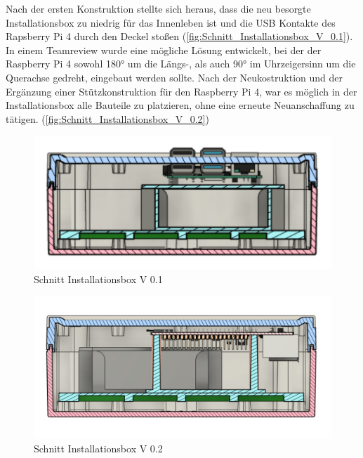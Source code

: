 Nach der ersten Konstruktion stellte sich heraus, dass die neu besorgte Installationsbox zu niedrig für das Innenleben ist und die USB Kontakte des Rapsberry Pi 4 durch den Deckel stoßen (\autoref{fig:Schnitt_Installationsbox_V_0.1}). In einem Teamreview wurde eine mögliche Lösung entwickelt, bei der der Raspberry Pi 4 sowohl \ang{180} um die Längs-, als auch \ang{90} im Uhrzeigersinn um die Querachse gedreht, eingebaut werden sollte. Nach der Neukostruktion und der Ergänzung einer Stützkonstruktion für den Raspberry Pi 4, war es möglich in der Installationsbox alle Bauteile zu platzieren, ohne eine erneute Neuanschaffung zu tätigen. (\autoref{fig:Schnitt_Installationsbox_V_0.2})

\begin{figure}[h]
	\begin{center}
		\includegraphics[scale=0.25]{Sections/Konstruktion_des_Aufbaus/Schnitt_Installationsbox_V_0.1}
	\end{center}
	\caption{Schnitt Installationsbox V 0.1}
	\label{fig:Schnitt_Installationsbox_V_0.1}
\end{figure}


\begin{figure}[h]
	\begin{center}
		\includegraphics[scale=0.25]{Sections/Konstruktion_des_Aufbaus/Schnitt_Installationsbox_V_0.2}
	\end{center}
	\caption{Schnitt Installationsbox V 0.2}
	\label{fig:Schnitt_Installationsbox_V_0.2}
\end{figure}


